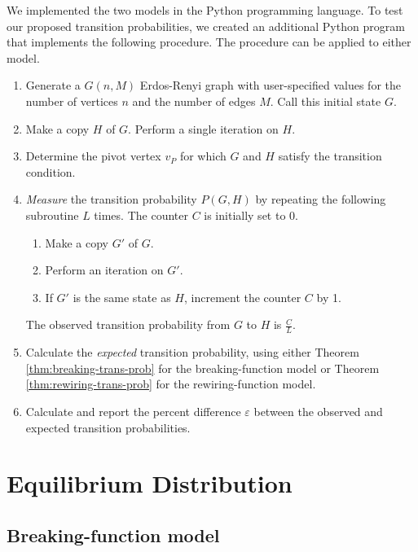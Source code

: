 \documentclass[a4paper,10pt]{article}
\begin{document}
We implemented the two models in the Python programming language. To test our proposed transition probabilities, we created an additional Python program that implements the following procedure. The procedure can be applied to either model.

\begin{enumerate}
 \item Generate a $G(n, M)$ Erdos-Renyi graph with user-specified values for the number of vertices $n$ and the number of edges $M$. Call this initial state $G$.
 \item Make a copy $H$ of $G$. Perform a single iteration on $H$.
 \item Determine the pivot vertex $v_P$ for which $G$ and $H$ satisfy the transition condition.
 \item \emph{Measure} the transition probability $P(G, H)$ by repeating the following subroutine $L$ times. The counter $C$ is initially set to 0.

    \begin{enumerate}
      \item Make a copy $G'$ of $G$.
      \item Perform an iteration on $G'$.
      \item If $G'$ is the same state as $H$, increment the counter $C$ by 1.
    \end{enumerate}

  The observed transition probability from $G$ to $H$ is $\frac{C}{L}$.

 \item Calculate the \emph{expected} transition probability, using either Theorem \ref{thm:breaking-trans-prob} for the breaking-function model or Theorem \ref{thm:rewiring-trans-prob} for the rewiring-function model.

 \item Calculate and report the percent difference $\varepsilon$ between the observed and expected transition probabilities.
\end{enumerate}  

\section{Equilibrium Distribution}

\subsection{Breaking-function model}
\end{document}
